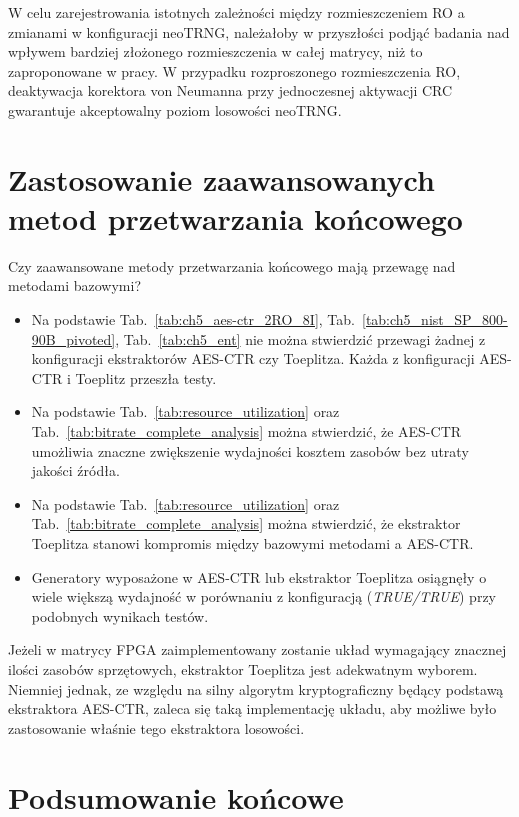 W celu zarejestrowania istotnych zależności między rozmieszczeniem RO a zmianami 
w konfiguracji neoTRNG, należałoby w przyszłości podjąć badania nad wpływem 
bardziej złożonego rozmieszczenia w całej matrycy, niż to zaproponowane w 
pracy. W przypadku rozproszonego rozmieszczenia RO, deaktywacja korektora 
von Neumanna przy jednoczesnej aktywacji CRC gwarantuje akceptowalny poziom 
losowości neoTRNG.

\section{Zastosowanie zaawansowanych metod przetwarzania końcowego}
\noindent Czy zaawansowane metody przetwarzania końcowego mają przewagę nad metodami bazowymi?
\begin{itemize}
\item Na podstawie Tab.~\ref{tab:ch5_aes-ctr_2RO_8I}, Tab.~\ref{tab:ch5_nist_SP_800-90B_pivoted},
Tab.~\ref{tab:ch5_ent} nie można stwierdzić przewagi żadnej z konfiguracji
ekstraktorów AES-CTR czy Toeplitza. Każda z konfiguracji AES-CTR i Toeplitz przeszła
testy.

\item Na podstawie Tab.~\ref{tab:resource_utilization} oraz Tab.~\ref{tab:bitrate_complete_analysis}
można stwierdzić, że AES-CTR umożliwia znaczne zwiększenie wydajności kosztem
zasobów bez utraty jakości źródła.
\item Na podstawie Tab.~\ref{tab:resource_utilization} oraz Tab.~\ref{tab:bitrate_complete_analysis}
można stwierdzić, że ekstraktor Toeplitza stanowi kompromis między bazowymi
metodami a AES-CTR.
\item Generatory wyposażone w AES-CTR lub ekstraktor Toeplitza osiągnęły o wiele
większą wydajność w porównaniu z konfiguracją (\textit{TRUE/TRUE}) przy podobnych
wynikach testów.
\end{itemize}

Jeżeli w matrycy FPGA zaimplementowany zostanie układ wymagający znacznej 
ilości zasobów sprzętowych, ekstraktor Toeplitza jest adekwatnym wyborem. 
Niemniej jednak, ze względu na silny algorytm kryptograficzny będący podstawą 
ekstraktora AES-CTR, zaleca się taką implementację układu, aby możliwe było 
zastosowanie właśnie tego ekstraktora losowości.

\section{Podsumowanie końcowe}

